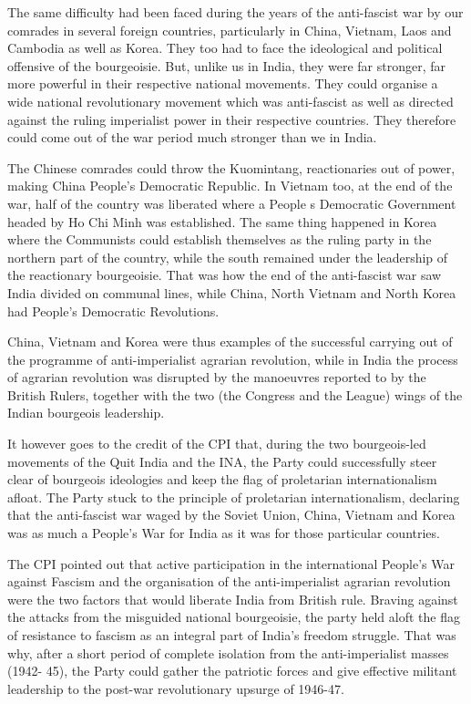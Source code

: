 The same difficulty had been faced during the years of the anti-fascist war by our comrades in several foreign countries, particularly in China, Vietnam, Laos and Cambodia as well as Korea. They too had to face the ideological and political offensive of the bourgeoisie. But, unlike us in India, they were far stronger, far more powerful in their respective national movements. They could organise a wide national revolutionary movement which was anti-fascist as well as directed against the ruling imperialist power in their respective countries. They therefore could come out of the war period much stronger than we in India. 

The Chinese comrades could throw the Kuomintang, reactionaries out of power, making China People’s Democratic Republic. In Vietnam too, at the end of the war, half of the country was liberated where a People s Democratic Government headed by Ho Chi Minh was established. The 
same thing happened in Korea where the Communists could establish themselves as the ruling party in the northern part of the country, while the south remained under the leadership 
of the reactionary bourgeoisie. That was how the end of the anti-fascist war saw India divided on communal lines, while China, North Vietnam and North Korea had People’s Democratic Revolutions. 

China, Vietnam and Korea were thus examples of the successful carrying out of the programme of anti-imperialist agrarian revolution, while in India the process of agrarian revolution was disrupted by the manoeuvres reported to by the British Rulers, together with the two (the Congress and the League) wings of the Indian bourgeois leadership. 

It however goes to the credit of the CPI that, during the two bourgeois-led movements of the Quit India and the INA, the Party could successfully steer clear of bourgeois ideologies and keep the flag of proletarian internationalism afloat. The Party stuck to the principle of proletarian internationalism, declaring that the anti-fascist war waged by the Soviet Union, China, Vietnam and Korea was as much a People’s War for India as it was for those particular countries. 

The CPI pointed out that active participation in the international People’s War against Fascism and the organisation of the anti-imperialist agrarian revolution were the two factors 
that would liberate India from British rule. Braving against the attacks from the misguided national bourgeoisie, the party held aloft the flag of resistance to fascism as an integral part of India’s freedom struggle. That was why, after a short period of complete isolation from the anti-imperialist masses (1942- 45), the Party could gather the patriotic forces and give effective militant leadership to the post-war revolutionary upsurge of 1946-47. 


